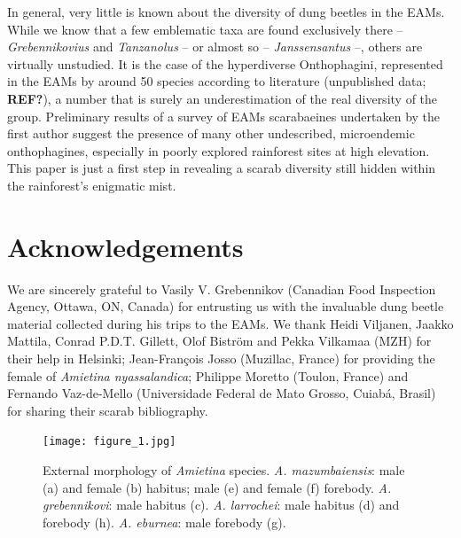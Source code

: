 \documentclass[fleqn,10pt,lineno]{wlpeerj}
\begin{document}
In general, very little is known about the diversity of dung beetles in the EAMs. While we know that a few emblematic taxa are found exclusively there -- \textit{Grebennikovius} \citep{montanaro2024microallopatric} and \textit{Tanzanolus} \citep{scholtz1987revision} -- or almost so -- \textit{Janssensantus} \citep{daniel2023dung, josso2022janssensantus} --, others are virtually unstudied. It is the case of the hyperdiverse Onthophagini, represented in the EAMs by around 50 species according to literature (unpublished data; \textbf{REF?}), a number that is surely an underestimation of the real diversity of the group. Preliminary results of a survey of EAMs scarabaeines undertaken by the first author suggest the presence of many other undescribed, microendemic onthophagines, especially in poorly explored rainforest sites at high elevation. This paper is just a first step in revealing a scarab diversity still hidden within the rainforest's enigmatic mist.


\section*{Acknowledgements}
We are sincerely grateful to Vasily V. Grebennikov (Canadian Food Inspection Agency, Ottawa, ON, Canada) for entrusting us with the invaluable dung beetle material collected during his trips to the EAMs. We thank Heidi Viljanen, Jaakko Mattila, Conrad P.D.T. Gillett, Olof Biström and Pekka Vilkamaa (MZH) for their help in Helsinki; Jean-Fran\c{c}ois Josso (Muzillac, France) for providing the female of \textit{Amietina nyassalandica}; Philippe Moretto (Toulon, France) and Fernando Vaz-de-Mello (Universidade Federal de Mato Grosso, Cuiabá, Brasil) for sharing their scarab bibliography. 

\begin{figure}[ht]
\centering
\texttt{[image: figure\_1.jpg]}
\caption{External morphology of \textit{Amietina} species. \textit{A. mazumbaiensis}: male (a) and female (b) habitus; male (e) and female (f) forebody. \textit{A. grebennikovi}: male habitus (c). \textit{A. larrochei}: male habitus (d) and forebody (h). \textit{A. eburnea}: male forebody (g).}
\label{fig:fig1}
\end{figure}
\end{document}
